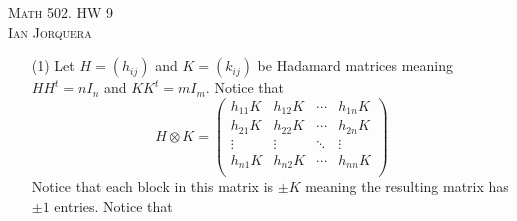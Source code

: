 \documentclass[12pt]{amsart}
\begin{document}
\begin{center}
    \textsc{Math 502. HW 9\\ Ian Jorquera}
\end{center}
\vspace{1em}

\begin{itemize}
\item[(1)] %
Let $H=(h_{ij})$ and $K=(k_{ij})$ be Hadamard matrices meaning $HH^t=n I_n$ and $KK^t=m I_m$. Notice that 
$$H\otimes K=
\begin{pmatrix}
h_{11}K & h_{12}K&\cdots & h_{1n}K\\
h_{21}K & h_{22}K&\cdots & h_{2n}K\\
\vdots&\vdots&\ddots&\vdots\\
h_{n1}K & h_{n2}K&\cdots & h_{nn}K\\
\end{pmatrix}$$
Notice that each block in this matrix is $\pm K$ meaning the resulting matrix has $\pm 1$ entries. Notice that
    

\end{itemize}
\end{document}

